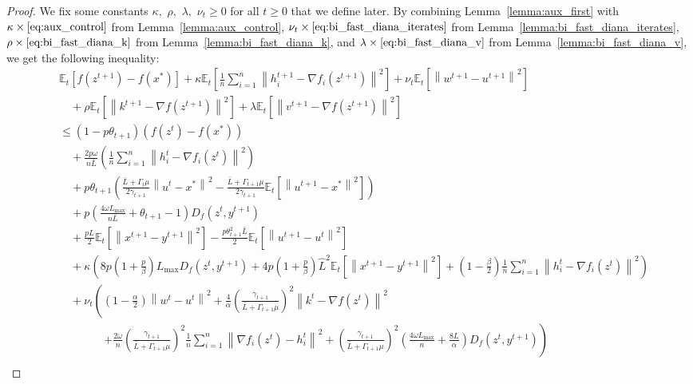 \documentclass{article} %
\newcommand{\norm}[1]{\left\| #1 \right\|}
\newcommand{\ExpSub}[2]{{\mathbb{E}}_{#1}\left[#2\right]}
\theoremstyle{plain}
\theoremstyle{definition}
\theoremstyle{remark}
\begin{document}
\begin{proof}
  We fix some constants $\kappa,$ $\rho,$ $\lambda,$ $\nu_{t} \geq 0$ for all $t \geq 0$ that we define later. By combining Lemma~\ref{lemma:aux_first} with $\kappa \times \eqref{eq:aux_control}$ from Lemma~\ref{lemma:aux_control}, $\nu_{t} \times \eqref{eq:bi_fast_diana_iterates}$ from Lemma~\ref{lemma:bi_fast_diana_iterates}, $\rho \times \eqref{eq:bi_fast_diana_k}$ from Lemma~\ref{lemma:bi_fast_diana_k}, and $\lambda \times \eqref{eq:bi_fast_diana_v}$ from Lemma~\ref{lemma:bi_fast_diana_v}, we get the following inequality:
  \begin{align*}
    &\ExpSub{t}{f(z^{t+1}) - f(x^*)} + \kappa \ExpSub{t}{\frac{1}{n}\sum_{i=1}^n \norm{h_i^{t+1} - \nabla f_i(z^{t+1})}^2} + \nu_{t} \ExpSub{t}{\norm{w^{t+1} - u^{t+1}}^2}\\
    &\quad  + \rho \ExpSub{t}{\norm{k^{t+1} - \nabla f(z^{t+1})}^2} + \lambda \ExpSub{t}{\norm{v^{t+1} - \nabla f(z^{t+1})}^2}\\
    &\leq (1 - p\theta_{t+1}) \left(f(z^{t}) - f(x^*)\right) \\
    &\quad + \frac{2 p \omega}{n \bar{L}} \left(\frac{1}{n}\sum_{i=1}^n \norm{h_i^t - \nabla f_i(z^{t})}^2\right) \\
    &\quad+ p\theta_{t+1} \left(\frac{\bar{L} + \Gamma_{t} \mu}{2 \gamma_{t+1}} \norm{u^t - x^*}^2 - \frac{\bar{L} + \Gamma_{t+1} \mu}{2 \gamma_{t+1}} \ExpSub{t}{\norm{u^{t+1} - x^*}^2}\right) \\
    &\quad+ p\left(\frac{4 \omega L_{\max}}{n \bar{L}} + \theta_{t+1} - 1 \right) D_f(z^t, y^{t+1}) \\
    &\quad+ \frac{pL}{2} \ExpSub{t}{\norm{x^{t+1} - y^{t+1}}^2} - \frac{p \theta_{t+1}^2 \bar{L}}{2} \ExpSub{t}{\norm{u^{t+1} - u^t}^2} \\
    &\quad + \kappa \left(8 p \left(1 + \frac{p}{\beta}\right) L_{\max} D_f(z^t, y^{t+1}) + 4 p \left(1 + \frac{p}{\beta}\right) \widehat{L}^2 \ExpSub{t}{\norm{x^{t+1} - y^{t+1}}^2} + \left(1 - \frac{\beta}{2}\right) \frac{1}{n}\sum_{i=1}^n \norm{h^{t}_i - \nabla f_i(z^t)}^2\right) \\
    &\quad + \nu_{t} \left(\left(1 - \frac{\alpha}{2}\right) \norm{w^t - u^t}^2  + \frac{4}{\alpha} \left(\frac{\gamma_{t+1}}{\bar{L} + \Gamma_{t+1} \mu}\right)^2 \norm{k^t - \nabla f(z^{t})}^2\right. \\
    &\qquad\qquad \left.+ \frac{2 \omega}{n} \left(\frac{\gamma_{t+1}}{\bar{L} + \Gamma_{t+1} \mu}\right)^2\frac{1}{n}\sum_{i=1}^n \norm{\nabla f_i(z^{t}) - h_i^t}^2 + \left(\frac{\gamma_{t+1}}{\bar{L} + \Gamma_{t+1} \mu}\right)^2\left(\frac{4 \omega L_{\max}}{n}  + \frac{8L}{\alpha}\right)D_f(z^t, y^{t+1})\right) \\

\end{align*}
\end{proof}
\end{document}
